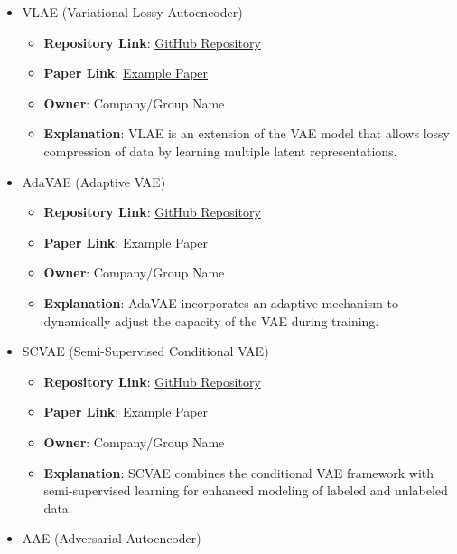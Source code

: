 \documentclass{article}
\begin{document}
{\begin{itemize}
\begin{itemize}
      \item \textbf{Owner}: Company/Group Name
      \item \textbf{Explanation}: HiVAE incorporates hierarchical structure into the VAE framework to capture hierarchical relationships in data.
    \end{itemize}
  \item VLAE (Variational Lossy Autoencoder)
    \begin{itemize}
      \item \textbf{Repository Link}: \href{https://github.com/username/vlae}{GitHub Repository}
      \item \textbf{Paper Link}: \href{https://arxiv.org/abs/9012.3456}{Example Paper}
      \item \textbf{Owner}: Company/Group Name
      \item \textbf{Explanation}: VLAE is an extension of the VAE model that allows lossy compression of data by learning multiple latent representations.
    \end{itemize}
  \item AdaVAE (Adaptive VAE)
    \begin{itemize}
      \item \textbf{Repository Link}: \href{https://github.com/username/adavae}{GitHub Repository}
      \item \textbf{Paper Link}: \href{https://arxiv.org/abs/6789.0123}{Example Paper}
      \item \textbf{Owner}: Company/Group Name
      \item \textbf{Explanation}: AdaVAE incorporates an adaptive mechanism to dynamically adjust the capacity of the VAE during training.
    \end{itemize}
  \item SCVAE (Semi-Supervised Conditional VAE)
    \begin{itemize}
      \item \textbf{Repository Link}: \href{https://github.com/username/scvae}{GitHub Repository}
      \item \textbf{Paper Link}: \href{https://arxiv.org/abs/3456.7890}{Example Paper}
      \item \textbf{Owner}: Company/Group Name
      \item \textbf{Explanation}: SCVAE combines the conditional VAE framework with semi-supervised learning for enhanced modeling of labeled and unlabeled data.
    \end{itemize}
  \item AAE (Adversarial Autoencoder)

\end{itemize}}
\end{document}
